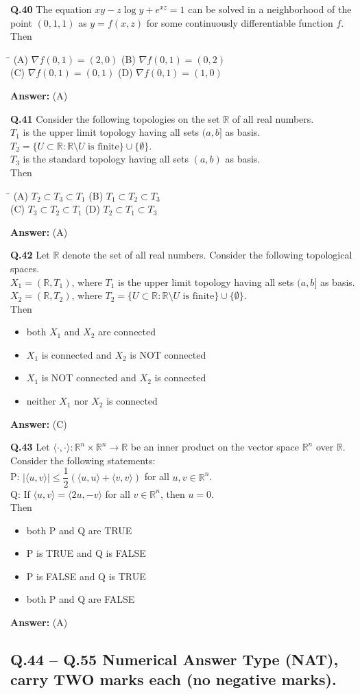 \documentclass[11pt,a4paper]{article}
\newcommand{\optsfourA}[4]{%
  \begin{tabbing}
    \hspace{0.48\linewidth}\=\kill
    (A) #1 \> (B) #2 \\[2pt]
    (C) #3 \> (D) #4
  \end{tabbing}%
}
\newcommand{\optslistA}[4]{%
  \begin{itemize}
    \setlength{\itemsep}{2pt}\setlength{\parskip}{0pt}
    \item[(A)] #1
    \item[(B)] #2
    \item[(C)] #3
    \item[(D)] #4
  \end{itemize}%
}
\newcommand{\ans}[1]{\textbf{Answer:} #1\par\medskip}
\begin{document}
\textbf{Q.40} The equation $xy - z\log y + e^{xz} = 1$ can be solved in a neighborhood of the point $(0, 1, 1)$ as $y = f(x, z)$ for some continuously differentiable function $f$. Then
\optsfourA{$\nabla f(0, 1) = (2, 0)$}{$\nabla f(0, 1) = (0, 2)$}{$\nabla f(0, 1) = (0, 1)$}{$\nabla f(0, 1) = (1, 0)$}
\ans{(A)}

\textbf{Q.41} Consider the following topologies on the set $\mathbb{R}$ of all real numbers.\\
$T_1$ is the upper limit topology having all sets $(a, b]$ as basis.\\
$T_2 = \{U \subset \mathbb{R} : \mathbb{R} \setminus U \text{ is finite}\} \cup \{\emptyset\}$.\\
$T_3$ is the standard topology having all sets $(a, b)$ as basis.\\
Then
\optsfourA{$T_2 \subset T_3 \subset T_1$}{$T_1 \subset T_2 \subset T_3$}{$T_3 \subset T_2 \subset T_1$}{$T_2 \subset T_1 \subset T_3$}
\ans{(A)}

\textbf{Q.42} Let $\mathbb{R}$ denote the set of all real numbers. Consider the following topological spaces.\\
$X_1 = (\mathbb{R}, T_1)$, where $T_1$ is the upper limit topology having all sets $(a, b]$ as basis.\\
$X_2 = (\mathbb{R}, T_2)$, where $T_2 = \{U \subset \mathbb{R} : \mathbb{R} \setminus U \text{ is finite}\} \cup \{\emptyset\}$.\\
Then
\optslistA{both $X_1$ and $X_2$ are connected}{$X_1$ is connected and $X_2$ is NOT connected}{$X_1$ is NOT connected and $X_2$ is connected}{neither $X_1$ nor $X_2$ is connected}
\ans{(C)}

\textbf{Q.43} Let $\langle \cdot, \cdot \rangle : \mathbb{R}^n \times \mathbb{R}^n \to \mathbb{R}$ be an inner product on the vector space $\mathbb{R}^n$ over $\mathbb{R}$. Consider the following statements:\\
P: $|\langle u, v \rangle| \le \dfrac{1}{2}(\langle u, u \rangle + \langle v, v \rangle)$ for all $u, v \in \mathbb{R}^n$.\\
Q: If $\langle u, v \rangle = \langle 2u, -v \rangle$ for all $v \in \mathbb{R}^n$, then $u = 0$.\\
Then
\optslistA{both P and Q are TRUE}{P is TRUE and Q is FALSE}{P is FALSE and Q is TRUE}{both P and Q are FALSE}
\ans{(A)}

\subsection*{Q.44 -- Q.55 Numerical Answer Type (NAT), carry TWO marks each (no negative marks).}
\end{document}
